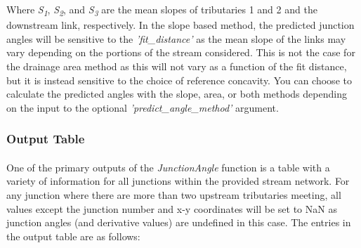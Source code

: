 \noindent Where \textit{S\textsubscript{1}}, \textit{S\textsubscript{2}}, and \textit{S\textsubscript{3}} are the mean slopes of tributaries 1 and 2 and the downstream link, respectively. In the slope based method, the predicted junction angles will be sensitive to the \textit{'fit\_distance'} as the mean slope of the links may vary depending on the portions of the stream considered. This is not the case for the drainage area method as this will not vary as a function of the fit distance, but it is instead sensitive to the choice of reference concavity. You can choose to calculate the predicted angles with the slope, area, or both methods depending on the input to the optional \textit{'predict\_angle\_method'} argument.

\subsubsection{Output Table}
\paragraph{}One of the primary outputs of the \textit{JunctionAngle} function is a table with a variety of information for all junctions within the provided stream network. For any junction where there are more than two upstream tributaries meeting, all values except the junction number and x-y coordinates will be set to NaN as junction angles (and derivative values) are undefined in this case. The entries in the output table are as follows:

